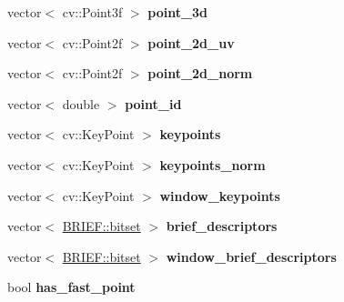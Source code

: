 \begin{DoxyCompactItemize}
\item 
\mbox{\label{classKeyFrame_a76734cb8b395bdb2f83fdc4deec4daa9}} 
vector$<$ cv\+::\+Point3f $>$ {\bfseries point\+\_\+3d}
\item 
\mbox{\label{classKeyFrame_ab469903f9a6893b76dfb023df2245447}} 
vector$<$ cv\+::\+Point2f $>$ {\bfseries point\+\_\+2d\+\_\+uv}
\item 
\mbox{\label{classKeyFrame_ac310ed11278f6a9be8baebc423d78276}} 
vector$<$ cv\+::\+Point2f $>$ {\bfseries point\+\_\+2d\+\_\+norm}
\item 
\mbox{\label{classKeyFrame_a29e1084cab91ec970ad7e731f8c1cec7}} 
vector$<$ double $>$ {\bfseries point\+\_\+id}
\item 
\mbox{\label{classKeyFrame_a27fcc3c3b7000fb82991299e0c5285c6}} 
vector$<$ cv\+::\+Key\+Point $>$ {\bfseries keypoints}
\item 
\mbox{\label{classKeyFrame_a25ae96b0d2b00a86459d90d04109bcd7}} 
vector$<$ cv\+::\+Key\+Point $>$ {\bfseries keypoints\+\_\+norm}
\item 
\mbox{\label{classKeyFrame_ad3bf8e781f139983ee8b4a8dbc5277d5}} 
vector$<$ cv\+::\+Key\+Point $>$ {\bfseries window\+\_\+keypoints}
\item 
\mbox{\label{classKeyFrame_a7603c27ea0b6339154e713908013c335}} 
vector$<$ \hyperlink{classDVision_1_1BRIEF_abc56a095174a93b0741099f35230b7c5}{B\+R\+I\+E\+F\+::bitset} $>$ {\bfseries brief\+\_\+descriptors}
\item 
\mbox{\label{classKeyFrame_a8ee95568c50c8b7bb4dc4e32d71e57af}} 
vector$<$ \hyperlink{classDVision_1_1BRIEF_abc56a095174a93b0741099f35230b7c5}{B\+R\+I\+E\+F\+::bitset} $>$ {\bfseries window\+\_\+brief\+\_\+descriptors}
\item 
\mbox{\label{classKeyFrame_a23a16b1456db21477bc96303b6ab7328}} 
bool {\bfseries has\+\_\+fast\+\_\+point}
\item 
\mbox{\label{classKeyFrame_a89d480b06f7d27750a13ebff55565f8d}} 

\end{DoxyCompactItemize}
